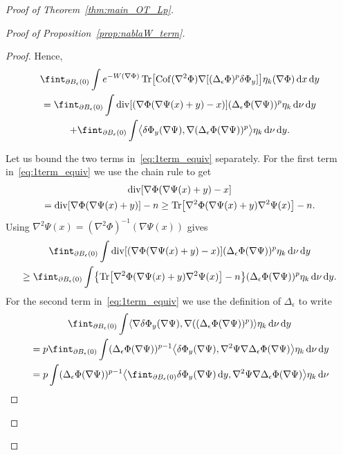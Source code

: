 \documentclass[10pt]{amsart}
\theoremstyle{definition}\newtheorem{defi}[theo]{Definition}\newtheorem{rema}[theo]{Remark}\newtheorem{exam}[theo]{Example}\newtheorem{exem}[theo]{Example}\newtheorem{nota}[theo]{Notation}
\DeclareMathOperator{\Tr}{Tr}
\DeclareMathOperator{\Cof}{Cof}
\DeclareMathOperator{\Div}{div}
\newcommand{\W}{W}
\newcommand{\dd}{n}
\newcommand{\target}{\nu}
\newcommand*\diff{\mathop{}\!\mathrm{d}}
\newcommand{\OT}{\Phi}
\newcommand{\avgint}{\fint}
\newcommand{\findiff}{\delta\OT}
\let\originalleft\left
\let\originalright\right
\renewcommand{\left}{\mathopen{}\mathclose\bgroup\originalleft}
\renewcommand{\right}{\aftergroup\egroup\originalright}
\begin{document}
\begin{proof}[Proof of Theorem~\ref{thm:main_OT_Lp}]
\begin{proof}[Proof of Proposition~\ref{prop:nablaW_term}]
\begin{proof}
Hence,
\begin{multline}\label{eq:1term_equiv}
\avgint_{\partial B_{\epsilon}(0)}\int e^{-\W(\nabla\OT)} \Tr\left[\Cof(\nabla^2\OT)\nabla[(\Delta_{\epsilon}\OT)^p\findiff_y]\right]\eta_k(\nabla\OT)\diff x\diff y\\
=\avgint_{\partial B_{\epsilon}(0)}\int \Div[\left(\nabla \OT(\nabla\Psi(x)+y)-x\right)](\Delta_{\epsilon}\OT(\nabla\Psi))^p \eta_k\diff \target\diff y\\
+\avgint_{\partial B_{\epsilon}(0)}\int \bigl\langle\findiff_y(\nabla\Psi),\nabla(\Delta_{\epsilon}\OT(\nabla\Psi))^p \bigr\rangle\eta_k\diff \target\diff y.
\end{multline}

Let us bound the two terms in~\eqref{eq:1term_equiv} separately. For the first term in~\eqref{eq:1term_equiv} we use the chain rule to get
\begin{multline*}
\Div[\nabla \OT(\nabla\Psi(x)+y)-x]\\
=\Div[\nabla \OT(\nabla\Psi(x)+y)]-\dd\ge \Tr\left[\nabla^2\OT(\nabla\Psi(x)+y)\nabla^2\Psi(x)\right]-\dd.
\end{multline*}
Using $\nabla^2\Psi(x)=(\nabla^2\OT)^{-1}(\nabla\Psi(x))$ gives
\begin{multline}\label{eq:1term_1}
\avgint_{\partial B_{\epsilon}(0)}\int \Div[\left(\nabla \OT(\nabla\Psi(x)+y)-x\right)](\Delta_{\epsilon}\OT(\nabla\Psi))^p \eta_k\diff \target\diff y\\
\ge \avgint_{\partial B_{\epsilon}(0)}\int\left \{\Tr\left[\nabla^2\OT(\nabla\Psi(x)+y)\nabla^2\Psi(x)\right]-\dd\right\}(\Delta_{\epsilon}\OT(\nabla\Psi))^p \eta_k\diff \target\diff y.
\end{multline}
For the second term in~\eqref{eq:1term_equiv} we use the definition of $\Delta_{\epsilon}$ to write
\begin{multline}\label{eq:1term_2}
\avgint_{\partial B_{\epsilon}(0)}\int \left\langle\nabla \findiff_y(\nabla\Psi), \nabla\left((\Delta_{\epsilon}\OT(\nabla \Psi))^p\right) \right\rangle \eta_k\diff \target\diff y
\\ 
\begin{aligned}
&=p\avgint_{\partial B_{\epsilon}(0)}\int (\Delta_{\epsilon}\OT(\nabla \Psi))^{p-1} \left\langle \findiff_y(\nabla\Psi), \nabla^2\Psi \nabla\Delta_{\epsilon}\OT(\nabla \Psi)\right\rangle \eta_k\diff \target\diff y\\
&=p\int (\Delta_{\epsilon}\OT(\nabla \Psi))^{p-1} \left\langle \avgint_{\partial B_{\epsilon}(0)}\findiff_y(\nabla\Psi)\diff y,\nabla^2\Psi \nabla\Delta_{\epsilon}\OT(\nabla \Psi)\right\rangle \eta_k\diff \target \\

\end{aligned}
\end{multline}
\end{proof}
\end{proof}
\end{proof}
\end{document}
